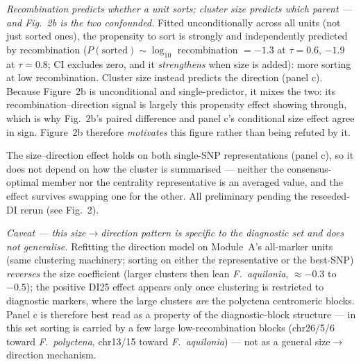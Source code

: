 \documentclass[11pt]{article}
\newcommand{\Faq}{\textit{F.~aquilonia}}
\newcommand{\Fpo}{\textit{F.~polyctena}}
\begin{document}
{%
\emph{Recombination predicts \emph{whether} a unit sorts; cluster size predicts \emph{which}
parent --- and Fig.~2b is the two confounded.} Fitted unconditionally across all units (not just
sorted ones), the propensity to sort is strongly and independently predicted by recombination
($P(\text{sorted}) \sim \log_{10}$ recombination $= -1.3$ at $\tau=0.6$, $-1.9$ at $\tau=0.8$; CI
excludes zero, and it \emph{strengthens} when size is added): more sorting at low recombination.
Cluster size instead predicts the direction (panel c). Because Figure~2b is unconditional and
single-predictor, it mixes the two: its recombination--direction signal is largely this
propensity effect showing through, which is why Fig.~2b's paired difference and panel c's
conditional size effect agree in sign. Figure~2b therefore \emph{motivates} this figure rather
than being refuted by it.

The size--direction effect holds on both single-SNP representations (panel c), so it does not
depend on how the cluster is summarised --- neither the consensus-optimal member nor the centrality
representative is an averaged value, and the effect survives swapping one for the other. All
preliminary pending the reseeded-DI rerun (see Fig.~2).

\emph{Caveat --- this size$\to$direction pattern is specific to the diagnostic set and does not
generalise.} Refitting the direction model on Module~A's all-marker units (same clustering
machinery; sorting on either the representative or the best-SNP) \emph{reverses} the size
coefficient (larger clusters then lean \Faq{}, $\approx-0.3$ to $-0.5$); the positive DI25 effect
appears only once clustering is restricted to diagnostic markers, where the large clusters
\emph{are} the polyctena centromeric blocks. Panel c is therefore best read as a property of the
diagnostic-block structure --- in this set sorting is carried by a few large low-recombination
blocks (chr26/5/6 toward \Fpo{}, chr13/15 toward \Faq{}) --- not as a general size$\to$direction
mechanism.}
\end{document}
